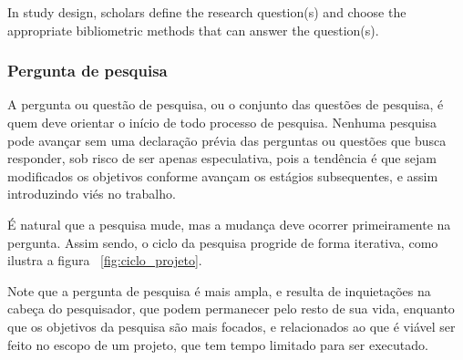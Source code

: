 \begin{itquote}
    In study design, scholars define the research question(s) and choose the appropriate bibliometric methods that can
answer the question(s).
\end{itquote}

\subsubsection{Pergunta de pesquisa}
A pergunta ou questão de pesquisa, ou o conjunto das questões de pesquisa, é quem deve orientar o início de todo processo de pesquisa. Nenhuma pesquisa pode avançar sem uma declaração prévia das perguntas ou questões que busca responder, sob risco de ser apenas especulativa, pois a tendência é que sejam modificados os objetivos conforme avançam os estágios subsequentes, e assim introduzindo viés no trabalho.


É natural que a pesquisa mude, mas a mudança deve ocorrer primeiramente na pergunta. Assim sendo, o ciclo da pesquisa progride de forma iterativa, como ilustra a figura ~\ref{fig:ciclo_projeto}.

Note que a pergunta de pesquisa é mais ampla, e resulta de inquietações na cabeça do pesquisador, que podem permanecer pelo resto de sua vida, enquanto que os objetivos da pesquisa são mais focados, e relacionados ao que é viável ser feito no escopo de um projeto, que tem tempo limitado para ser executado.

